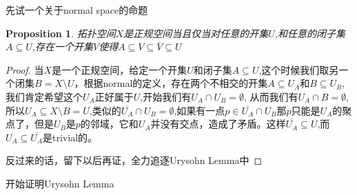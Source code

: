\documentclass{article}
\newtheorem{proposition}[theorem]{Proposition}
\begin{document}
先试一个关于normal space的命题
\begin{proposition}
拓扑空间$X$是正规空间当且仅当对任意的开集$U$,和任意的闭子集$A \subseteq U$,存在一个开集$V$使得$A \subseteq V \subseteq \overline{V} \subseteq U$
\end{proposition}

\begin{proof}
当$X$是一个正规空间，给定一个开集$U$和闭子集$A \subseteq U$,这个时候我们取另一个闭集$B = X \setminus U$，根据normal的定义，存在两个不相交的开集$A \subseteq U_A$和$B \subseteq U_B$,我们肯定希望这个$U_A$正好属于$U$,开始我们有$U_A \cap U_B = \emptyset$, 从而我们有$U_A \cap B = \emptyset$,所以$U_A \subseteq X \setminus B = U$,类似的$\overline{U_A} \cap U_B = \emptyset$,如果有一点$p \in \overline{U_A} \cap U_B$那$p$只能是$U_A$的聚点了，但是$U_B$是$p$的邻域，它和$U_A$并没有交点，造成了矛盾。这样$\overline{U_A} \subseteq U$,而$U_A \subseteq \overline{U_A}$是trivial的。

反过来的话，留下以后再证，全力追逐Urysohn Lemma中
\end{proof}

开始证明Urysohn Lemma
\end{document}
